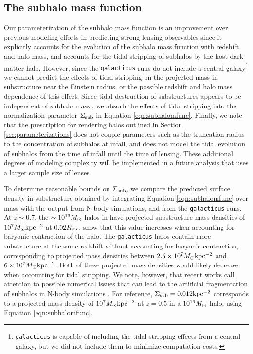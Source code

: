 \subsection{The subhalo mass function}
\label{ssec:submfuncassumptions}
Our parameterization of the subhalo mass function is an improvement over previous modeling efforts in predicting strong lensing observables since it explicitly accounts for the evolution of the subhalo mass function with redshift and halo mass, and accounts for the tidal stripping of subhalos by the host dark matter halo. However, since the {\tt{galacticus}} runs do not include a central galaxy\footnote{{\tt{galacticus}} is capable of including the tidal stripping effects from a central galaxy, but we did not include them to minimize computation costs.} we cannot predict the effects of tidal stripping on the projected mass in substructure near the Einstein radius, or the possible redshift and halo mass dependence of this effect. Since tidal destruction of substructures appears to be independent of subhalo mass \citep{GK++17,Graus++18}, we absorb the effects of tidal stripping into the normalization parameter $\Sigma_{\rm{sub}}$ in Equation \ref{eqn:subhalomfunc}. Finally, we note that the prescription for rendering halos outlined in Section \ref{sec:parameterizations} does not couple parameters such as the truncation radius to the concentration of subhalos at infall, and does not model the tidal evolution of subhalos from the time of infall until the time of lensing. These additional degrees of modeling complexity will be implemented in a future analysis that uses a larger sample size of lenses.

To determine reasonable bounds on $\Sigma_{\rm{sub}}$, we compare the predicted surface density in substructure obtained by integrating Equation \ref{eqn:subhalomfunc} over mass with the output from N-body simulations, and from the {\tt{galacticus}} runs. At $z \sim 0.7$, the $\sim 10^{13} {M_{\odot}}$ halos in \citet{Fiacconi++16} have projected substructure mass densities of $10^7 {M_{\odot}} \rm{kpc^{-2}}$ at $0.02 R_{\rm{vir}}$. \citet{Fiacconi++16} show that this value increases when accounting for baryonic contraction of the halo. The {\tt{galacticus}} halos contain more substructure at the same redshift without accounting for baryonic contraction, corresponding to projected mass densities between $2.5 \times 10^{7} {M_{\odot}} \rm{kpc^{-2}}$ and $6 \times 10^{7} {M_{\odot}} \rm{kpc^{-2}}$. Both of these projected mass densities would likely decrease when accounting for tidal stripping. We note, however, that recent works call attention to possible numerical issues that can lead to the artificial fragmentation of subhalos in N-body simulations \citep{vandenBosch++18,ErraniPenarrubia19}. For reference, $\Sigma_{\rm{sub}} = 0.012 \rm{kpc^{-2}}$ corresponds to a projected mass density of $10^{7}{M_{\odot}} \rm{kpc^{-2}}$ at $z=0.5$ in a $10^{13}{M_{\odot}}$ halo, using Equation \ref{eqn:subhalomfunc}. 

